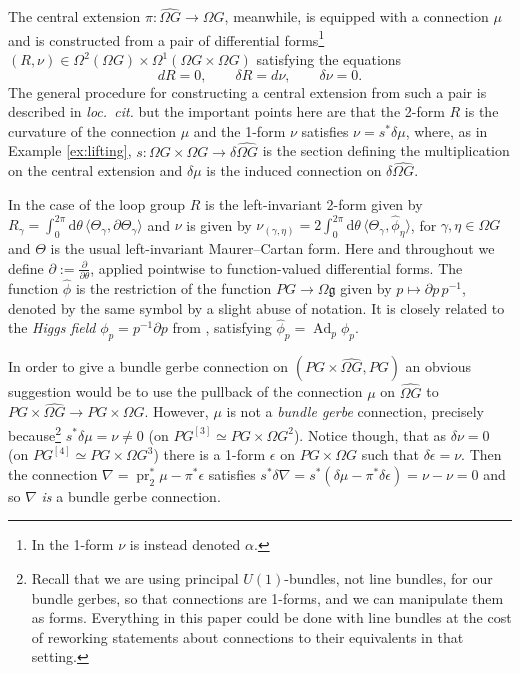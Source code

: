 \documentclass[12pt]{amsart}
\DeclareMathOperator{\Ad}{Ad}
\DeclareMathOperator{\pr}{pr}
\theoremstyle{plain}
\theoremstyle{definition}
\theoremstyle{remark}
\numberwithin{equation}{section}
\renewcommand{\d}{\delta}
\newcommand{\g}{\mathfrak g}
\newcommand{\<}{\langle}
\renewcommand{\>}{\rangle}
\newcommand{\intSone}{\int_{0}^{2\pi}\mathrm{d}\theta\,}
\newcommand{\Omegahat}[1]{\widehat{\Omega #1}}
\newcommand{\phihat}{\widehat{\phi}}
\newcommand{\phihatfun}[1]{\partial #1\,#1^{-1}}
\begin{document}
The central extension $\pi\colon\Omegahat{G}\to \Omega G$, meanwhile, is equipped with a connection $\mu$ and is constructed from a pair of differential forms\footnote{In \cite{MS03} the 1-form $\nu$ is instead denoted $\alpha$.} $(R,\nu) \in \Omega^2(\Omega G) \times \Omega^1(\Omega G \times \Omega G)$ satisfying the equations \cite{MS03}
\[
dR		= 0, \qquad
\d R		= d \nu, \qquad
\d \nu		= 0.
\]
The general procedure for constructing a central extension from such a pair is described in \emph{loc.\ cit.} but the important points here are that the 2-form $R$ is the curvature of the connection $\mu$ and the 1-form $\nu$ satisfies $\nu = s^* \d \mu$, where, as in Example \ref{ex:lifting}, $s\colon  \Omega G \times \Omega G \to \d \widehat{\Omega G}$ is the section defining the multiplication on the central extension and $\d \mu$ is the induced connection on $\d \widehat{\Omega G}$.

\label{form:nu}
In the case of the loop group \label{form:central extension curvature} $R$ is the left-invariant 2-form given by $R_\gamma = \intSone \langle\Theta_\gamma,\partial \Theta_\gamma \rangle$
and $\nu$ is given by $\nu_{(\gamma,\eta)}= 2\intSone\langle\Theta_\gamma,\phihat_\eta\rangle$, for $\gamma, \eta \in \Omega G$ and $\Theta$ is the usual left-invariant Maurer--Cartan form. 
Here and throughout we define $\partial := \tfrac{\partial}{\partial \theta}$, applied pointwise to function-valued differential forms.
The function $\phihat$ is the restriction of the function $PG\to \Omega \g$ given by $p\mapsto \phihatfun{p}$, denoted by the same symbol by a slight abuse of notation. 
It is closely related to the \emph{Higgs field} $\phi_p = p^{-1} \partial p$ from \cite{MS03}, satisfying $\phihat_p = \Ad_p \phi_p$.


In order to give a bundle gerbe connection on $(PG \times\widehat{\Omega G}, PG)$ an obvious suggestion would be to use the pullback of the connection $\mu$ on $\widehat{\Omega G}$ to $PG\times \widehat{\Omega G} \to PG\times \Omega G$. 
However, $\mu$ is not a \emph{bundle gerbe} connection, precisely because\footnote{Recall that we are using principal $U(1)$-bundles, not line bundles, for our bundle gerbes, so that connections are 1-forms, and we can manipulate them as forms. Everything in this paper could be done with line bundles at the cost of reworking statements about connections to their equivalents in that setting.} $s^*\d \mu = \nu \neq 0$ (on $PG^{[3]}\simeq PG\times \Omega G^2$). 
Notice though, that as $\d \nu = 0$ (on $PG^{[4]}\simeq PG\times \Omega G^3$) there is a 1-form $\epsilon$ on $PG\times \Omega G$ such that $\d \epsilon = \nu$. 
Then the connection $\nabla = \pr_2^*\mu - \pi^*\epsilon$ satisfies $s^*\d \nabla = s^* (\d \mu -  \pi^*\d \epsilon) = \nu - \nu = 0$ and so $\nabla$ \emph{is} a bundle gerbe connection.
\end{document}
